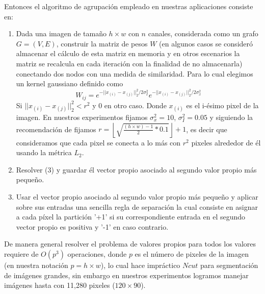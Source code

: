 \documentclass[conference]{IEEEtran}
\begin{document}
Entonces el algoritmo de agrupación empleado en nuestras aplicaciones consiste en:\\
\begin{enumerate}
\item Dada una imagen de tamaño $h \times w$ con $n$ canales, considerada como un grafo $G=(V,E)$, construir la matriz de pesos $W$ (en algunos casos se consideró almacenar el cálculo de esta matriz en memoria y en otros escenarios la matriz se recalcula en cada iteración con la finalidad de no almacenarla) conectando dos nodos con una medida de similaridad. Para lo cual elegimos un kernel gaussiano definido como 
\[
W_{ij}= e^{-||x_{(i)}-x_{(j)}||^2_2/2\sigma^2_I}e^{-||x_{(i)}-x_{(j)}||^2_2/2\sigma_x^2}
\] 
Si $||x_{(i)}-x_{(j)}||_2^2 < r^2$ y 0 en otro caso. Donde $x_{(i)}$ es el i-ésimo pixel de la imagen. En nuestros experimentos fijamos $\sigma_x^2=10$, $\sigma_I^2=0.05$ y siguiendo la recomendación de \cite{Ncut} fijamos $r = \left \lfloor
 \sqrt{\frac{(h\times w)-1}{2}*0.1}\right \rfloor +1 $, es decir que consideramos que cada pixel se conecta a lo más con $r^2$ pixeles alrededor de él usando la métrica $L_2$.\\  

\item Resolver (3) y guardar él vector propio asociado al segundo valor propio más pequeño. \\

\item Usar el vector propio asociado al segundo valor propio más pequeño y aplicar sobre sus entradas una sencilla regla de separación la cual consiste en asignar a cada píxel la partición '+1' si su correspondiente entrada en el segundo vector propio es positiva y '-1' en caso contrario.
\end{enumerate}
De manera general resolver el problema de valores propios para todos los valores requiere de $O(p^3)$ operaciones, donde $p$ es el número de pixeles de la imagen (en nuestra notación $p = h \times w$), lo cual hace impráctico $Ncut$ para segmentación de imágenes grandes, sin embargo en nuestros experimentos logramos manejar imágenes hasta con 11,280 pixeles ($120 \times 90$).\\
\end{document}
